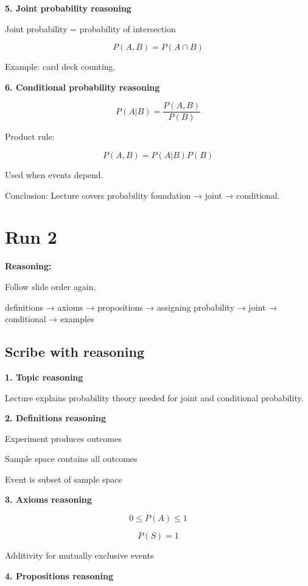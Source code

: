 \documentclass[12pt]{article}
\begin{document}
\bigskip

\textbf{5. Joint probability reasoning}

Joint probability = probability of intersection

\[
P(A,B) = P(A \cap B)
\]

Example: card deck counting.

\bigskip

\textbf{6. Conditional probability reasoning}

\[
P(A|B) = \frac{P(A,B)}{P(B)}
\]

Product rule:

\[
P(A,B) = P(A|B)P(B)
\]

Used when events depend.

\bigskip

Conclusion: Lecture covers probability foundation → joint → conditional.


\newpage

\section*{Run 2}

\textbf{Reasoning:}

Follow slide order again.

definitions → axioms → propositions → assigning probability → joint → conditional → examples

\subsection*{Scribe with reasoning}

\textbf{1. Topic reasoning}

Lecture explains probability theory needed for joint and conditional probability.

\bigskip

\textbf{2. Definitions reasoning}

Experiment produces outcomes

Sample space contains all outcomes

Event is subset of sample space

\bigskip

\textbf{3. Axioms reasoning}

\[
0 \le P(A) \le 1
\]

\[
P(S) = 1
\]

Additivity for mutually exclusive events

\bigskip

\textbf{4. Propositions reasoning}
\end{document}
